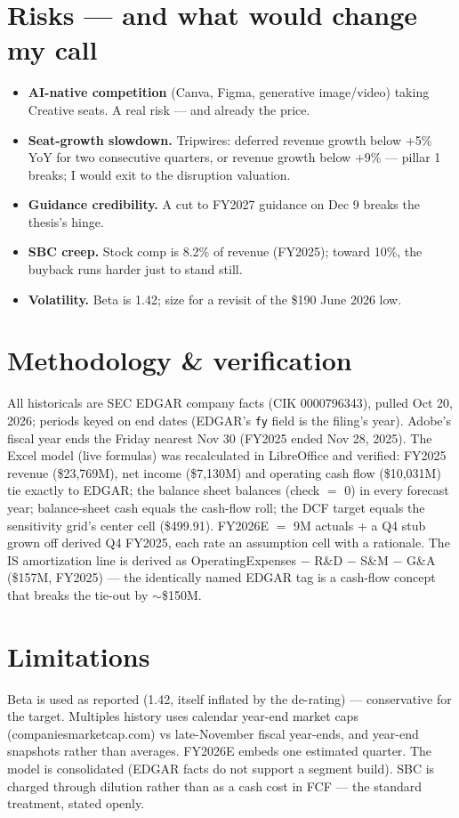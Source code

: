 \documentclass[9pt]{extarticle}
\begin{document}
\section*{Risks --- and what would change my call}
\begin{itemize}
\item \textbf{AI-native competition} (Canva, Figma, generative image/video) taking Creative seats. A real risk --- and already the price.
\item \textbf{Seat-growth slowdown.} Tripwires: deferred revenue growth below +5\% YoY for two consecutive quarters, or revenue growth below +9\% --- pillar 1 breaks; I would exit to the disruption valuation.
\item \textbf{Guidance credibility.} A cut to FY2027 guidance on Dec 9 breaks the thesis's hinge.
\item \textbf{SBC creep.} Stock comp is 8.2\% of revenue (FY2025); toward 10\%, the buyback runs harder just to stand still.
\item \textbf{Volatility.} Beta is 1.42; size for a revisit of the \$190 June 2026 low.
\end{itemize}

\section*{Methodology \& verification}
All historicals are SEC EDGAR company facts (CIK 0000796343), pulled Oct 20, 2026; periods keyed on end dates (EDGAR's \texttt{fy} field is the filing's year). Adobe's fiscal year ends the Friday nearest Nov 30 (FY2025 ended Nov 28, 2025). The Excel model (live formulas) was recalculated in LibreOffice and verified: FY2025 revenue (\$23,769M), net income (\$7,130M) and operating cash flow (\$10,031M) tie exactly to EDGAR; the balance sheet balances (check $=$ 0) in every forecast year; balance-sheet cash equals the cash-flow roll; the DCF target equals the sensitivity grid's center cell (\$499.91). FY2026E $=$ 9M actuals + a Q4 stub grown off derived Q4 FY2025, each rate an assumption cell with a rationale. The IS amortization line is derived as OperatingExpenses $-$ R\&D $-$ S\&M $-$ G\&A (\$157M, FY2025) --- the identically named EDGAR tag is a cash-flow concept that breaks the tie-out by $\sim$\$150M.

\section*{Limitations}
Beta is used as reported (1.42, itself inflated by the de-rating) --- conservative for the target. Multiples history uses calendar year-end market caps (companiesmarketcap.com) vs late-November fiscal year-ends, and year-end snapshots rather than averages. FY2026E embeds one estimated quarter. The model is consolidated (EDGAR facts do not support a segment build). SBC is charged through dilution rather than as a cash cost in FCF --- the standard treatment, stated openly.
\end{document}

